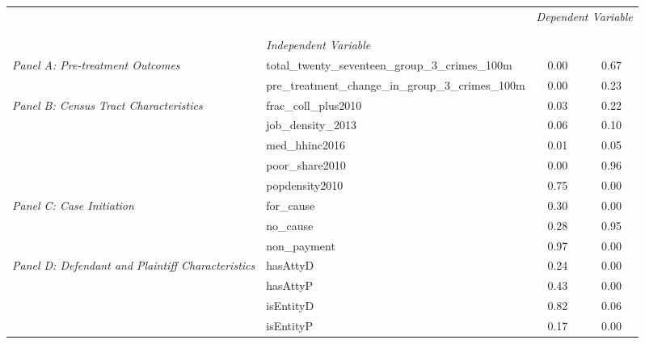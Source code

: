 \begin{tabular}{llcc}
\toprule
 &  & \multicolumn{2}{c}{\textit{Dependent Variable}} \\
\cline{3-4}
\\
 &  &  &  \\
 & \emph{Independent Variable} &  &  \\
\midrule
\multirow[c]{2}{3cm}{\textit{Panel A: Pre-treatment Outcomes}} & total_twenty_seventeen_group_3_crimes_100m & 0.00 & 0.67 \\
 & pre_treatment_change_in_group_3_crimes_100m & 0.00 & 0.23 \\
\cline{1-4}
\multirow[c]{5}{3cm}{\textit{Panel B: Census Tract Characteristics}} & frac_coll_plus2010 & 0.03 & 0.22 \\
 & job_density_2013 & 0.06 & 0.10 \\
 & med_hhinc2016 & 0.01 & 0.05 \\
 & poor_share2010 & 0.00 & 0.96 \\
 & popdensity2010 & 0.75 & 0.00 \\
\cline{1-4}
\multirow[c]{3}{3cm}{\textit{Panel C: Case Initiation}} & for_cause & 0.30 & 0.00 \\
 & no_cause & 0.28 & 0.95 \\
 & non_payment & 0.97 & 0.00 \\
\cline{1-4}
\multirow[c]{4}{3cm}{\textit{Panel D: Defendant and Plaintiff Characteristics}} & hasAttyD & 0.24 & 0.00 \\
 & hasAttyP & 0.43 & 0.00 \\
 & isEntityD & 0.82 & 0.06 \\
 & isEntityP & 0.17 & 0.00 \\
\cline{1-4}
\bottomrule
\end{tabular}
